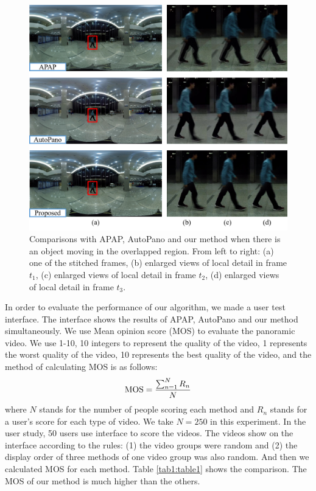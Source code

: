 \documentclass[conference]{IEEEtran}
\begin{document}
\begin{figure}[!htpb]
\centering
\includegraphics[scale=0.36]{picture36.png}
\caption{Comparisons with APAP, AutoPano and our method when there is an object moving in the overlapped region. From left to right: (a) one of the stitched frames, (b) enlarged views of local
detail in frame $t_1$, (c) enlarged views of local detail in frame $t_2$, (d) enlarged views of local detail in frame $t_3$.}
\label{fig:pic15}
\end{figure}

In order to evaluate the performance of our algorithm, we made a user test interface. The interface shows the results of APAP, AutoPano and our method simultaneously.
We use Mean opinion score (MOS) to evaluate the panoramic video. We use 1-10, 10 integers to represent the quality of the video, 
1 represents the worst quality of the video, 10 represents the best quality of the video, and the method of calculating MOS is as follows:
\begin{equation}
{\rm MOS}=\frac{\sum^{N}_{n=1}{R_n}}{N}
\end{equation}
where $N$ stands for the number of people scoring each method and $R_n$ stands for a user's score for each type of video. We take $N=250$ in this experiment.
In the user study, 50 users use interface to score the videos. The videos show on the interface according to the rules: (1) the video groups were random and 
(2) the display order of three methods of one video group was also random.
And then we calculated MOS for each method. Table \ref{tab1:table1} shows the comparison. The MOS of our method is much higher than the others.
\end{document}
